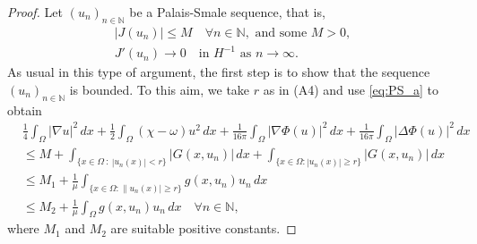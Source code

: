 \documentclass[10pt,a4paper]{amsart}
\numberwithin{equation}{section}
\begin{document}
\begin{proof}
 Let $(u_n)_{n \in \mathbb N}$ be a Palais-Smale sequence, that is,
 \begin{gather}
  |J(u_n)| \leq M \quad \forall n \in \mathbb N, \text{ and  some } M > 0, 
   \label{eq:PS_a} \\
  J'(u_n) \to 0 \quad \text{in } H^{-1} \text{ as } n \to \infty. \label{eq:PS_b}
 \end{gather}
As usual in this type of argument, the first step is to show that the sequence 
$(u_n)_{n \in \mathbb N}$ is bounded. To this aim, we take $r$ as in (A4)
and  use  \eqref{eq:PS_a} to obtain
\begin{equation}
\begin{aligned}
&\frac{1}{4} \int_\Omega |\nabla u|^2 \,dx
  + \frac{1}{2} \int_\Omega (\chi - \omega) u^2 \,dx
  + \frac{1}{16 \pi} \int_\Omega |\nabla \Phi(u)|^2 \,dx
  + \frac{1}{16 \pi} \int_\Omega |\Delta \Phi(u)|^2 \,dx  \\
& \leq M + \int_{\{x \in \Omega \ : \ |u_n(x)| < r\}} |G(x, u_n)| \,dx
 + \int_{\{x \in \Omega  :  |u_n(x)| \geq r\}} |G(x, u_n)| \,dx  \\
& \leq M_1 + \frac{1}{\mu} \int_{\{x \in \Omega  : \|u_n(x)| \geq r\}} g(x, u_n) u_n \,dx  \\
& \leq M_2 + \frac{1}{\mu} \int_\Omega g(x, u_n) u_n \,dx \quad
\forall n \in \mathbb N,
\end{aligned}\label{eq:estimate_PS_a}
\end{equation}
where $M_1$ and $M_2$ are suitable positive constants.


\end{proof}
\end{document}
